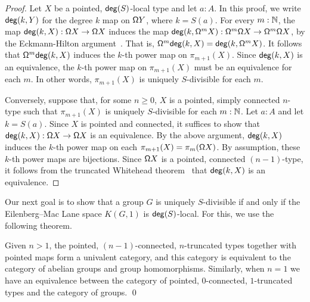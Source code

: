 \begin{proof}
    Let $X$ be a pointed, $\mathsf{deg}(S)$-local type and let $a : A$.
    In this proof, we write $\mathsf{deg}(k, Y)$ for the degree $k$ map on $\mathsf{\Omega} Y$,
    where $k = S(a)$.
    For every $m : \mathbb{N}$,
    the map $\mathsf{deg}(k, X) : \mathsf{\Omega} X \to \mathsf{\Omega} X$ induces
    the map $\mathsf{deg}(k, \mathsf{\Omega}^m X) : \mathsf{\Omega}^m \mathsf{\Omega} X \to \mathsf{\Omega}^m \mathsf{\Omega} X$,
    by the Eckmann-Hilton argument~\cite[Theorem~2.1.6]{hottbook}.
    That is, $\mathsf{\Omega}^m \mathsf{deg}(k, X) = \mathsf{deg}(k, \mathsf{\Omega}^m X)$.
    It follows that $\mathsf{\Omega}^m \mathsf{deg}(k, X)$ induces the $k$-th power map on $\pi_{m+1}( X )$.
    Since $\mathsf{deg}(k, X)$ is an equivalence, the $k$-th power map on $\pi_{m+1}( X )$
    must be an equivalence for each $m$.
    In other words, $\pi_{m+1}( X )$ is uniquely $S$-divisible for each $m$.

    Conversely, suppose that, for some $n \geq 0$, $X$ is a pointed,
    simply connected $n$-type such that $\pi_{m+1}(X)$ is uniquely $S$-divisible
    for each $m : \mathbb{N}$.
    Let $a : A$ and let $k = S(a)$.
    Since $X$ is pointed and connected, it suffices to show that
    $\mathsf{deg}(k, X) : \mathsf{\Omega} X \to \mathsf{\Omega} X$ is an equivalence.
    By the above argument, $\mathsf{deg}(k, X)$ induces the $k$-th power map on each
    $\pi_{m+1}(X) = \pi_m(\mathsf{\Omega} X)$.
    By assumption, these $k$-th power maps are bijections.
    Since $\mathsf{\Omega} X$ is a pointed, connected $(n-1)$-type, it follows from the
    truncated Whitehead theorem~\cite[Theorem~8.8.3]{hottbook} that 
    $\mathsf{deg}(k, X)$ is an equivalence.
\end{proof}

Our next goal is to show that a group $G$ is uniquely $S$-divisible if and only
if the Eilenberg--Mac Lane space $K(G, 1)$ is $\mathsf{deg}(S)$-local.
For this, we use the following theorem.

\begin{thm}\label{theorem:catofgroups}
    Given $n>1$, the pointed, $(n-1)$-connected, $n$-truncated types together with pointed maps
    form a univalent category, and this category is equivalent to the category of abelian groups
    and group homomorphisms.
    Similarly, when $n=1$ we have an equivalence between the category of pointed, $0$-connected,
    $1$-truncated types and the category of groups. \qed
\end{thm}

